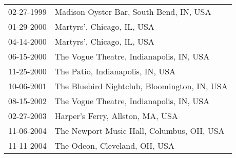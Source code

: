 \begin{supertabular}{ll}
 02-27-1999 &       Madison Oyster Bar, South Bend, IN, USA \\
 01-29-2000 &                    Martyrs', Chicago, IL, USA \\
 04-14-2000 &                    Martyrs', Chicago, IL, USA \\
 06-15-2000 &      The Vogue Theatre, Indianapolis, IN, USA \\
 11-25-2000 &              The Patio, Indianapolis, IN, USA \\
 10-06-2001 &  The Bluebird Nightclub, Bloomington, IN, USA \\
 08-15-2002 &      The Vogue Theatre, Indianapolis, IN, USA \\
 02-27-2003 &              Harper's Ferry, Allston, MA, USA \\
 11-06-2004 &     The Newport Music Hall, Columbus, OH, USA \\
 11-11-2004 &                 The Odeon, Cleveland, OH, USA \\
\end{supertabular}
